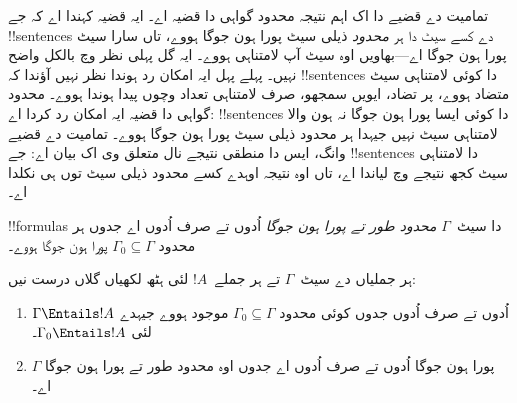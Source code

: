 \documentclass[../../../include/open-logic-section]{subfiles}
\begin{document}
      {}
      {}


تمامیت دے قضیے دا اک اہم نتیجہ محدود گواہی دا قضیہ اے۔
ایہ قضیہ کہندا اے کہ جے !!{sentence}s دے کسے سیٹ دا ہر
\emph{محدود} ذیلی سیٹ پورا ہون جوگا ہووے، تاں سارا سیٹ
پورا ہون جوگا اے---بھاویں اوہ سیٹ آپ لامتناہی ہووے۔
ایہ گل پہلی نظر وچ بالکل واضح نہیں۔ پہلے پہل ایہ امکان
رد ہوندا نظر نہیں آؤندا کہ !!{sentence}s دا کوئی لامتناہی
سیٹ متضاد ہووے، پر تضاد، ایویں سمجھو، صرف لامتناہی تعداد
وچوں پیدا ہوندا ہووے۔ محدود گواہی دا قضیہ ایہ امکان رد
کردا اے: !!{sentence}s دا کوئی ایسا پورا ہون جوگا نہ ہون والا
لامتناہی سیٹ نہیں جیہدا ہر محدود ذیلی سیٹ پورا ہون جوگا
ہووے۔ تمامیت دے قضیے وانگ، ایس دا منطقی نتیجے نال
متعلق وی اک بیان اے: جے !!{sentence}s دا لامتناہی سیٹ
کجھ نتیجے وچ لیاندا اے، تاں اوہ نتیجہ اوہدے کسے محدود
ذیلی سیٹ توں ہی نکلدا اے۔

\begin{defn}
  !!{formula}s دا سیٹ~$\Gamma$ \emph{محدود طور تے پورا ہون جوگا}
  اُدوں تے صرف اُدوں اے جدوں ہر محدود $\Gamma_0 \subseteq \Gamma$
  پورا ہون جوگا ہووے۔
\end{defn}

\begin{thm}
ہر جملیاں دے سیٹ~$\Gamma$ تے ہر جملے~$!A$ لئی
ہٹھ لکھیاں گلاں درست نیں:
\begin{enumerate}
  \item $\Gamma \Entails !A$ اُدوں تے صرف اُدوں جدوں کوئی محدود
    $\Gamma_0 \subseteq \Gamma$ موجود ہووے جیہدے لئی
    $\Gamma_0 \Entails !A$۔
  \item $\Gamma$ پورا ہون جوگا اُدوں تے صرف اُدوں اے جدوں
    اوہ محدود طور تے پورا ہون جوگا اے۔
\end{enumerate}
\end{thm}
\end{document}
